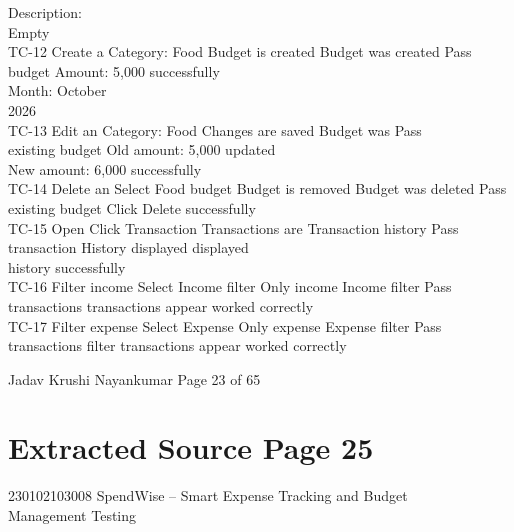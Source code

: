 \documentclass[12pt,a4paper]{report}
\begin{document}
Description:\\ 
Empty\\ 
TC-12     Create a        Category: Food        Budget is created   Budget was created Pass\\ 
budget          Amount: 5,000                             successfully\\ 
Month: October\\ 
2026\\ 
TC-13     Edit an         Category: Food        Changes are saved Budget was              Pass\\ 
existing budget Old amount: 5,000                         updated\\ 
New amount: 6,000                         successfully\\ 
TC-14     Delete an       Select Food budget Budget is removed Budget was deleted Pass\\ 
existing budget Click Delete                              successfully\\ 
TC-15     Open            Click Transaction     Transactions are    Transaction history Pass\\ 
transaction     History               displayed           displayed\\ 
history                                                   successfully\\ 
TC-16     Filter income   Select Income filter Only income          Income filter         Pass\\ 
transactions                          transactions appear worked correctly\\ 
TC-17     Filter expense Select Expense         Only expense        Expense filter        Pass\\ 
transactions    filter                transactions appear worked correctly\\ 

\smallskip

\smallskip

\smallskip
Jadav Krushi Nayankumar                                                            Page 23 of 65\\ 

\clearpage
\section*{Extracted Source Page 25}
230102103008                          SpendWise – Smart Expense Tracking and Budget\\ 
Management Testing\\ 
\end{document}
